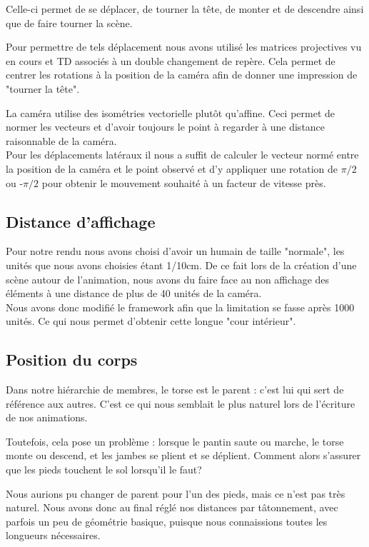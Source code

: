 \documentclass[10pt,a4paper,titlepage]{article}
\begin{document}
Celle-ci permet de se déplacer, de tourner la tête, de monter et de descendre ainsi que de faire tourner la scène.

Pour permettre de tels déplacement nous avons utilisé les matrices projectives vu en cours et TD associés à un double changement de repère. Cela permet de centrer les rotations à la position de la caméra afin de donner une impression de "tourner la tête".

La caméra utilise des isométries vectorielle plutôt qu'affine. Ceci permet de normer les vecteurs et d'avoir toujours le point à regarder à une distance raisonnable de la caméra.\\ 
Pour les déplacements latéraux il nous a suffit de calculer le vecteur normé entre la position de la caméra et le point observé et d'y appliquer une rotation de $\pi/2$ ou -$\pi/2$ pour obtenir le mouvement souhaité à un facteur de vitesse près.

\subsection{Distance d'affichage}

Pour notre rendu nous avons choisi d'avoir un humain de taille "normale", les unités que nous avons choisies étant 1/10cm. De ce fait lors de la création d'une scène autour de l'animation, nous avons du faire face au non affichage des éléments à une distance de plus de 40 unités de la caméra.\\

Nous avons donc modifié le framework afin que la limitation se fasse après 1000 unités. Ce qui nous permet d'obtenir cette longue "cour intérieur".

\subsection{Position du corps}
Dans notre hiérarchie de membres, le torse est le parent : c'est lui qui sert de référence aux autres. C'est ce qui nous semblait le plus naturel lors de l'écriture de nos animations. 
\par
Toutefois, cela pose un problème : lorsque le pantin saute ou marche, le torse monte ou descend, et les jambes se plient et se déplient. Comment alors s'assurer que les pieds touchent le sol lorsqu'il le faut? 
\par
Nous aurions pu changer de parent pour l'un des pieds, mais ce n'est pas très naturel. Nous avons donc au final réglé nos distances par tâtonnement, avec parfois un peu de géométrie basique, puisque nous connaissions toutes les longueurs nécessaires. 
\end{document}
